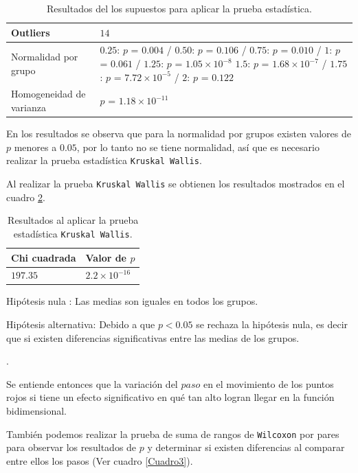 \documentclass{article}
\begin{document}
\begin{table}[ht]
\centering
\caption{Resultados del los supuestos para aplicar la prueba estadística.}
\smallskip

\begin{tabular}{ |p{2.1cm}|p{13cm}|}
 \hline
 Outliers & $14$ \\
 \hline
 Normalidad por grupo & $0.25$: $p$ = $0.004$ / $0.50$: $p$ = $0.106$ / $0.75$: $p$ = $0.010$ / $1$: $p$ = $0.061$ / $1.25$: $p$ = $1.05\times 10^{-8}$  $1.5$: $p$ = $1.68\times 10^{-7}$ / $1.75$: $p$ = $7.72\times 10^{-5}$ / $2$: $p$ = $0.122$ \\
 \hline
 Homogeneidad de varianza & $p$ = $1.18\times 10^{-11}$ \\
 \hline
\end{tabular}
\label{Cuadro1}
\end{table}

En los resultados se observa que para la normalidad por grupos existen valores de $p$ menores a $0.05$, por lo tanto no se tiene normalidad, así que es necesario realizar la prueba estadística \texttt{Kruskal Wallis}.
\bigskip

Al realizar la prueba \texttt{Kruskal Wallis} se obtienen los resultados mostrados en el cuadro \ref{Cuadro2}.

\begin{table}[h!]
\centering
\caption{Resultados al aplicar la prueba estadística \texttt{Kruskal Wallis}.}
\smallskip

\begin{tabular}{ |p{2.1cm}|p{2.1cm}|}
 \hline
 Chi cuadrada & Valor de $p$ \\
 \hline
 $197.35$ & $2.2\times 10^{-16}$ \\
 \hline
\end{tabular}
\label{Cuadro2}
\end{table}

Hipótesis nula : Las medias son iguales en todos los grupos.
\smallskip

Hipótesis alternativa: Debido a que $p < 0.05$ se rechaza la hipótesis nula, es decir que si existen diferencias significativas entre las medias de los grupos. 
\smallskip

\newpage
.
\bigskip

Se entiende entonces que la variación del $paso$ en el movimiento de los puntos rojos si tiene un efecto significativo en qué tan alto logran llegar en la función bidimensional.
\bigskip

También podemos realizar la prueba de suma de rangos de \texttt{Wilcoxon} por pares \citep{3} para observar los resultados de $p$ y determinar si existen diferencias al comparar entre ellos los pasos (Ver cuadro \ref{Cuadro3}).
\end{document}
